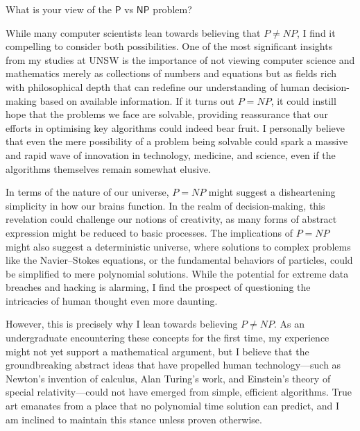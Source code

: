 \documentclass{article}
\begin{document}
\begin{question}
What is your view of the $\mathsf P$ vs $\mathsf{NP}$ problem?
\end{question}

\begin{solution}

While many computer scientists lean towards believing that  $P\neq NP$, I find it compelling to consider both possibilities. One of the most significant insights from my studies at UNSW is the importance of not viewing computer science and mathematics merely as collections of numbers and equations but as fields rich with philosophical depth that can redefine our understanding of human decision-making based on available information. If it turns out  $P=NP$, it could instill hope that the problems we face are solvable, providing reassurance that our efforts in optimising key algorithms could indeed bear fruit. I personally believe that even the mere possibility of a problem being solvable could spark a massive and rapid wave of innovation in technology, medicine, and science, even if the algorithms themselves remain somewhat elusive.

In terms of the nature of our universe, $P=NP$ might suggest a disheartening simplicity in how our brains function. In the realm of decision-making, this revelation could challenge our notions of creativity, as many forms of abstract expression might be reduced to basic processes. The implications of $P=NP$ might also suggest a deterministic universe, where solutions to complex problems like the Navier–Stokes equations, or the fundamental behaviors of particles, could be simplified to mere polynomial solutions. While the potential for extreme data breaches and hacking is alarming, I find the prospect of questioning the intricacies of human thought even more daunting.

However, this is precisely why I lean towards believing $P \neq NP$. As an undergraduate encountering these concepts for the first time, my experience might not yet support a mathematical argument, but I believe that the groundbreaking abstract ideas that have propelled human technology—such as Newton's invention of calculus, Alan Turing's work, and Einstein's theory of special relativity—could not have emerged from simple, efficient algorithms. True art emanates from a place that no polynomial time solution can predict, and I am inclined to maintain this stance unless proven otherwise.
\end{solution}
\end{document}
